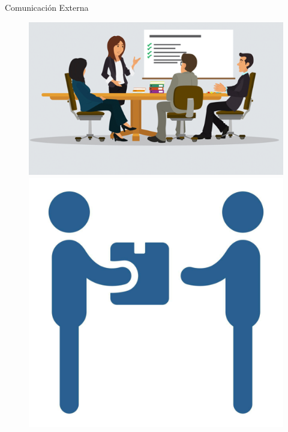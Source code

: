 \documentclass{beamer}
\begin{document}
\begin{frame}{Comunicaci\'on Externa}
	\begin{figure}[H]
	\centering
	\includegraphics[width=0.35\paperwidth, height=0.4\paperheight]{images_latex/reuniones} 
	\hspace{0.7cm}
	\includegraphics[width=0.35\paperwidth, height=0.4\paperheight]{images_latex/entrega}
	\end{figure}

\end{frame}
\end{document}
